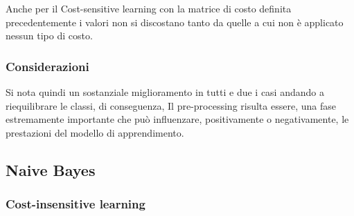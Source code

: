 \documentclass[italian,12pt,a4paper]{article}
\begin{document}
	Anche per il Cost-sensitive learning con la matrice di costo definita precedentemente i valori non si discostano tanto da quelle a cui non è applicato nessun tipo di costo.
	
	\subsubsection{Considerazioni}
	Si nota quindi un sostanziale miglioramento in tutti e due i casi andando a riequilibrare le classi, di conseguenza, Il pre-processing risulta essere, una fase estremamente importante che può
	influenzare, positivamente o negativamente, le prestazioni del modello di apprendimento.
	
	\subsection{Naive Bayes}
	
	\subsubsection{Cost-insensitive learning} %
	
\end{document}

